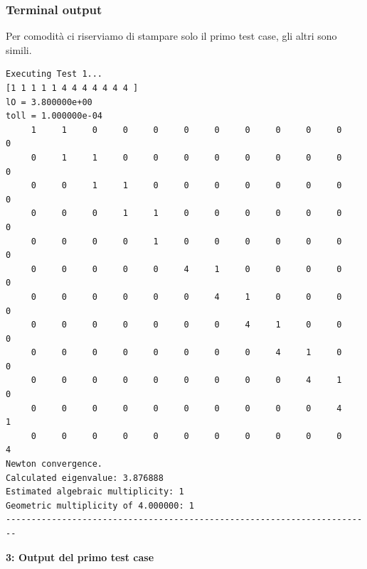 \documentclass[12pt]{article}
\begin{document}
\subsubsection{Terminal output}
Per comodità ci riserviamo di stampare solo il primo test case, gli altri sono simili.
    \begin{framed}
    \begin{verbatim}
Executing Test 1...
[1 1 1 1 1 4 4 4 4 4 4 4 ]
lO = 3.800000e+00
toll = 1.000000e-04
     1     1     0     0     0     0     0     0     0     0     0     0
     0     1     1     0     0     0     0     0     0     0     0     0
     0     0     1     1     0     0     0     0     0     0     0     0
     0     0     0     1     1     0     0     0     0     0     0     0
     0     0     0     0     1     0     0     0     0     0     0     0
     0     0     0     0     0     4     1     0     0     0     0     0
     0     0     0     0     0     0     4     1     0     0     0     0
     0     0     0     0     0     0     0     4     1     0     0     0
     0     0     0     0     0     0     0     0     4     1     0     0
     0     0     0     0     0     0     0     0     0     4     1     0
     0     0     0     0     0     0     0     0     0     0     4     1
     0     0     0     0     0     0     0     0     0     0     0     4    
Newton convergence.
Calculated eigenvalue: 3.876888
Estimated algebraic multiplicity: 1
Geometric multiplicity of 4.000000: 1
------------------------------------------------------------------------
    \end{verbatim}
    \end{framed}
    \begin{center}
        \textbf{3: Output del primo test case}
    \end{center}
    \newpage
\end{document}
